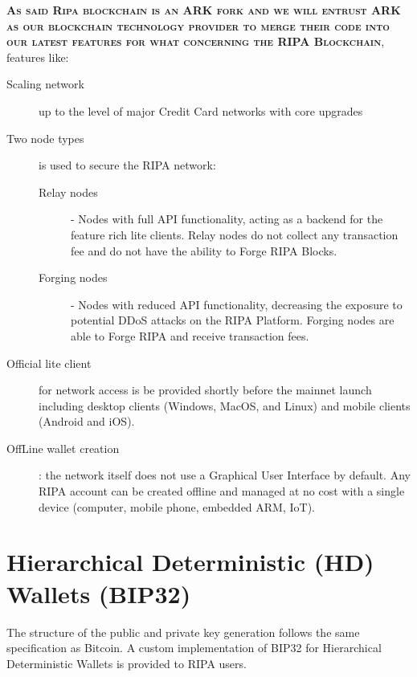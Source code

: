 \documentclass[11pt,fleqn,oneside]{book} %
\begin{document}
\vspace{5mm}
\textsc{\textbf{As said Ripa blockchain is an ARK fork and we will entrust ARK as our blockchain technology provider to merge their 
code into our latest features for what concerning the RIPA Blockchain}}, features like:
\begin{description}
	\item[Scaling network] up to the level of major Credit Card networks with core upgrades
	\item[Two node types] is used to secure the RIPA network:
	\begin{description}
		\item[Relay nodes] - Nodes with full API functionality, acting as a backend for the
		feature rich lite clients. Relay nodes do not collect any transaction fee and do
		not have the ability to Forge RIPA Blocks.
		\item[Forging nodes] - Nodes with reduced API functionality, decreasing the
		exposure to potential DDoS attacks on the RIPA Platform. Forging nodes are
		able to Forge RIPA and receive transaction fees.
	\end{description}
	\item[Official lite client] for network access is be provided shortly before the mainnet
	launch including desktop clients (Windows, MacOS, and Linux) and mobile clients
	(Android and iOS).
	\item[OffLine wallet creation]: the network itself does not use a Graphical User Interface by default. Any RIPA
	account can be created offline and managed at no cost with a single device
	(computer, mobile phone, embedded ARM, IoT).
\end{description}

\section{Hierarchical Deterministic (HD) Wallets (BIP32)}
The structure of the public and private key generation follows the same specification
as Bitcoin. A custom implementation of BIP32 for Hierarchical Deterministic Wallets
is provided to RIPA users.
\end{document}
